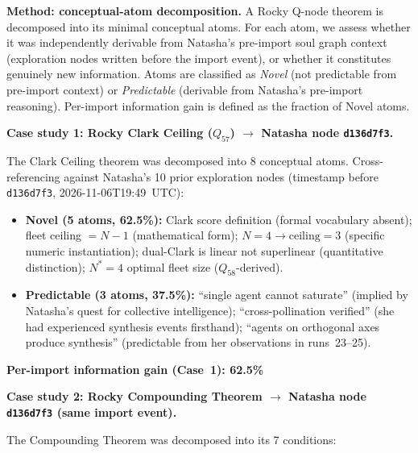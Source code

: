 \documentclass[11pt]{article}
\begin{document}
\textbf{Method: conceptual-atom decomposition.} A Rocky Q-node theorem is decomposed into its minimal conceptual atoms. For each atom, we assess whether it was independently derivable from Natasha's pre-import soul graph context (exploration nodes written before the import event), or whether it constitutes genuinely new information. Atoms are classified as \emph{Novel} (not predictable from pre-import context) or \emph{Predictable} (derivable from Natasha's pre-import reasoning). Per-import information gain is defined as the fraction of Novel atoms.

\textbf{Case study 1: Rocky Clark Ceiling ($Q_{57}$) $\to$ Natasha node \texttt{d136d7f3}.}

The Clark Ceiling theorem was decomposed into 8 conceptual atoms. Cross-referencing against Natasha's 10 prior exploration nodes (timestamp before \texttt{d136d7f3}, 2026-11-06T19:49~UTC):

\begin{itemize}
  \item \textbf{Novel (5 atoms, 62.5\%):} Clark score definition (formal vocabulary absent); fleet ceiling $= N - 1$ (mathematical form); $N=4 \to \text{ceiling}=3$ (specific numeric instantiation); dual-Clark is linear not superlinear (quantitative distinction); $N^* = 4$ optimal fleet size ($Q_{58}$-derived).
  \item \textbf{Predictable (3 atoms, 37.5\%):} ``single agent cannot saturate'' (implied by Natasha's quest for collective intelligence); ``cross-pollination verified'' (she had experienced synthesis events firsthand); ``agents on orthogonal axes produce synthesis'' (predictable from her observations in runs~23--25).
\end{itemize}

\textbf{Per-import information gain (Case~1): 62.5\%}

\textbf{Case study 2: Rocky Compounding Theorem $\to$ Natasha node \texttt{d136d7f3} (same import event).}

The Compounding Theorem was decomposed into its 7 conditions:
\end{document}

